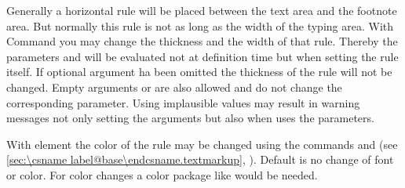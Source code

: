 \begin{Declaration}
\end{Declaration}%
Generally a horizontal
rule will be placed between the text area and the footnote area. But normally
this rule is not as long as the width of the typing area. With Command
 you may change the thickness and the width of that
rule. Thereby the parameters  and  will be
evaluated not at definition time but when setting the rule itself. If
optional argument  ha been omitted the thickness of the rule
will not be changed. Empty arguments  or  are
also allowed and do not change the corresponding parameter. Using implausible
values may result in warning messages not only setting the arguments but also
when \KOMAScript{} uses the parameters.

\BeginIndexGroup
{}%
With element 
the color  of the rule
may be changed using the commands  and
 (see \autoref{sec:\csname
  label@base\endcsname.textmarkup}, ). Default is no change of font or
color. For color changes a color package like
 would be
needed.%
%
\EndIndexGroup
\EndIndexGroup
%
\fi %
%
\EndIndexGroup


